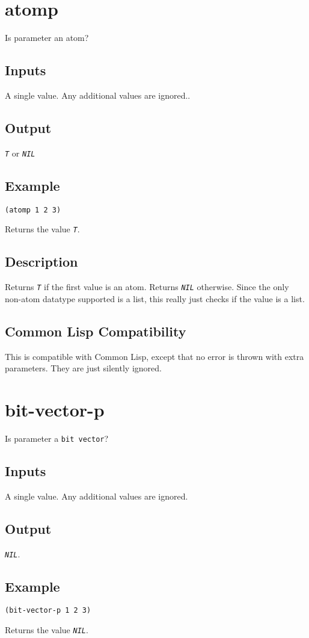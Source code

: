 \documentclass[10pt, openany]{book}
\newcommand{\constant}[1]{\emph{\texttt{#1}}}
\newcommand{\datatype}[1]{\texttt{#1}}
\newcommand{\cl}{Common Lisp}
\begin{document}
\section{atomp}
Is parameter an atom?
\subsection{Inputs}
A single value.  Any additional values are ignored..
\subsection{Output}
\constant{T} or \constant{NIL}
\subsection{Example}
\begin{lstlisting}
(atomp 1 2 3)
\end{lstlisting}
Returns the value \constant{T}.
\subsection{Description}
Returns \constant{T} if the first value is an atom.  Returns \constant{NIL} otherwise.  Since the only non-atom datatype supported is a list, this really just checks if the value is a list.
\subsection{Common Lisp Compatibility}
This is compatible with \cl, except that no error is thrown with extra parameters.  They are just silently ignored.

\section{bit-vector-p}
Is parameter a \datatype{bit vector}?
\subsection{Inputs}
A single value.  Any additional values are ignored.
\subsection{Output}
\constant{NIL}.
\subsection{Example}
\begin{lstlisting}
(bit-vector-p 1 2 3)
\end{lstlisting}
Returns the value \constant{NIL}.
\end{document}
